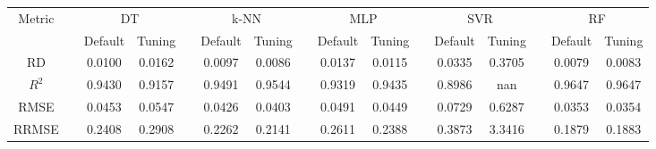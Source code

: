 \begin{table}[!htbp]
	\setlength{\tabcolsep}{3pt}
	\begin{tabular}{cccccccccccccccc}
		\toprule
		\multirow{2}{*}{Metric} & & \multicolumn{2}{c}{DT} & & \multicolumn{2}{c}{k-NN} & & \multicolumn{2}{c}{MLP} & & \multicolumn{2}{c}{SVR} & & \multicolumn{2}{c}{RF}\\
		 \cline{3-4} \cline{6-7} \cline{9-10} \cline{12-13} \cline{15-16}
		  & & Default & Tuning & & Default & Tuning & & Default & Tuning & & Default & Tuning & & Default & Tuning\\
		\midrule
		RD & & 0.0100 & 0.0162 & & 0.0097 & 0.0086 & & 0.0137 & 0.0115 & & 0.0335 & 0.3705 & & 0.0079 & 0.0083\\
		$R^2$ & & 0.9430 & 0.9157 & & 0.9491 & 0.9544 & & 0.9319 & 0.9435 & & 0.8986 & nan & & 0.9647 & 0.9647\\
		RMSE & & 0.0453 & 0.0547 & & 0.0426 & 0.0403 & & 0.0491 & 0.0449 & & 0.0729 & 0.6287 & & 0.0353 & 0.0354\\
		RRMSE & & 0.2408 & 0.2908 & & 0.2262 & 0.2141 & & 0.2611 & 0.2388 & & 0.3873 & 3.3416 & & 0.1879 & 0.1883\\
		\bottomrule
	\end{tabular}
\end{table}
